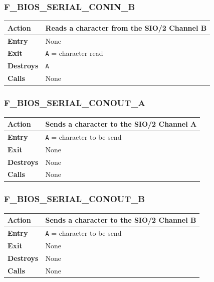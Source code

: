\documentclass[a4paper,11pt]{article}
\begin{document}
        \subsubsection{F\_BIOS\_SERIAL\_CONIN\_B}
        \label{func:fbiosserialconinb}
        \begin{tabular}{l p{9cm}}
            \hline\textbf{Action}
            & Reads a character from the \textbf{SIO/2} Channel B \\
            \hline\textbf{Entry} & None \\
            \hline\textbf{Exit} & \texttt{A} = character read \\
            \hline\textbf{Destroys} & \texttt{A} \\
            \hline\textbf{Calls} & None \\
            \hline
        \end{tabular}

        \subsubsection{F\_BIOS\_SERIAL\_CONOUT\_A}
        \label{func:fbiosserialconouta}
        \begin{tabular}{l p{9cm}}
            \hline\textbf{Action}
            & Sends a character to the \textbf{SIO/2} Channel A \\
            \hline\textbf{Entry} & \texttt{A} = character to be send \\
            \hline\textbf{Exit} & None \\
            \hline\textbf{Destroys} & None \\
            \hline\textbf{Calls} & None \\
            \hline
        \end{tabular}

        \subsubsection{F\_BIOS\_SERIAL\_CONOUT\_B}
        \label{func:fbiosserialconoutb}
        \begin{tabular}{l p{9cm}}
            \hline\textbf{Action}
            & Sends a character to the \textbf{SIO/2} Channel B \\
            \hline\textbf{Entry} & \texttt{A} = character to be send \\
            \hline\textbf{Exit} & None \\
            \hline\textbf{Destroys} & None \\
            \hline\textbf{Calls} & None \\
            \hline
        \end{tabular}
\end{document}
